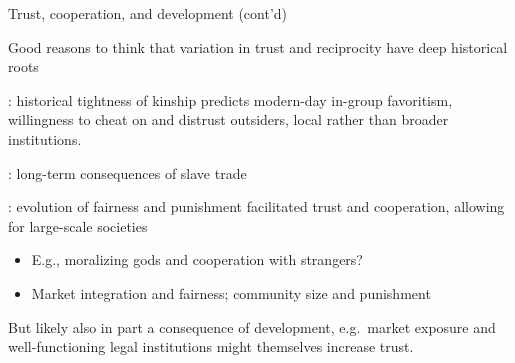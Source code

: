 \documentclass[aspectratio=169, 10pt, handout]{beamer}
\newenvironment{wideitemize}{\itemize\addtolength{\itemsep}{10pt}}{\enditemize}
\begin{document}
\begin{frame}{Trust, cooperation, and development (cont'd)}

\begin{wideitemize}

	\item Good reasons to think that variation in trust and reciprocity have deep historical roots
    
    \begin{wideitemize}

    \smallskip

	\item \cite{enke2008kinship}: historical tightness of kinship predicts modern-day in-group favoritism, willingness to cheat on and distrust outsiders, local rather than broader institutions. 

	\item \cite{nunn2011slave}: long-term consequences of slave trade

	\item \cite{henrich2010markets}: evolution of fairness and punishment facilitated trust and cooperation, allowing for large-scale societies 
	
	\begin{itemize}
	
		\item E.g., moralizing gods and cooperation with strangers?

		\item Market integration and fairness; community size and punishment

	\end{itemize}

    \end{wideitemize}


	\item But likely also in part a consequence of development, e.g.\ market exposure and well-functioning legal institutions might themselves increase trust.

	
\end{wideitemize}

\end{frame}
\end{document}
